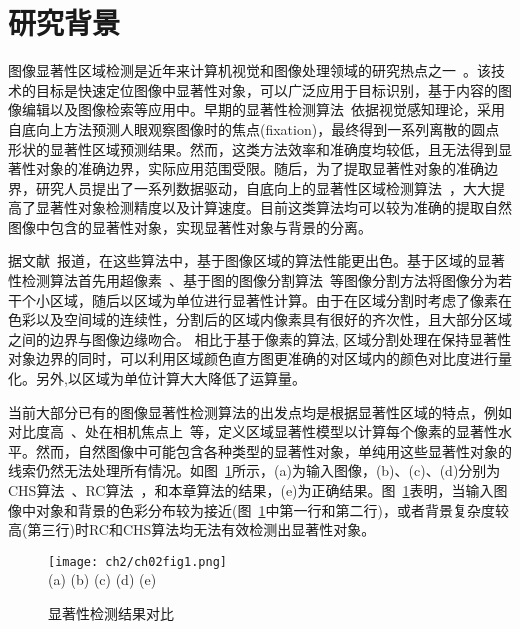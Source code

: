 \section{研究背景}
\label{sec:background}
图像显著性区域检测是近年来计算机视觉和图像处理领域的研究热点之一~\cite{saliencySurvey}。该技术的目标是快速定位图像中显著性对象，可以广泛应用于目标识别，基于内容的图像编辑以及图像检索等应用中。早期的显著性检测算法~\cite{itti}依据视觉感知理论，采用自底向上方法预测人眼观察图像时的焦点(fixation)，最终得到一系列离散的圆点形状的显著性区域预测结果。然而，这类方法效率和准确度均较低，且无法得到显著性对象的准确边界，实际应用范围受限。随后，为了提取显著性对象的准确边界，研究人员提出了一系列数据驱动，自底向上的显著性区域检测算法~\cite{Achanta08,ChengPAMI,ufo,Yan2014Hierarchical}，大大提高了显著性对象检测精度以及计算速度。目前这类算法均可以较为准确的提取自然图像中包含的显著性对象，实现显著性对象与背景的分离。\par
据文献~报道，在这些算法中，基于图像区域的算法性能更出色。基于区域的显著性检测算法首先用超像素~\cite{SLIC}、基于图的图像分割算法~\cite{graphseg}等图像分割方法将图像分为若干个小区域，随后以区域为单位进行显著性计算。由于在区域分割时考虑了像素在色彩以及空间域的连续性，分割后的区域内像素具有很好的齐次性，且大部分区域之间的边界与图像边缘吻合。 相比于基于像素的算法, 区域分割处理在保持显著性对象边界的同时，可以利用区域颜色直方图更准确的对区域内的颜色对比度进行量化。另外,以区域为单位计算大大降低了运算量。\par
当前大部分已有的图像显著性检测算法的出发点均是根据显著性区域的特点，例如对比度高~\cite{ChengPAMI}、处在相机焦点上~\cite{ufo}等，定义区域显著性模型以计算每个像素的显著性水平。然而，自然图像中可能包含各种类型的显著性对象，单纯用这些显著性对象的线索仍然无法处理所有情况。如图~\ref{fig:saliencyCom}所示，(a)为输入图像，(b)、(c)、(d)分别为CHS算法~\cite{Yan2014Hierarchical}、RC算法~\cite{ChengPAMI}，和本章算法的结果，(e)为正确结果。图~\ref{fig:saliencyCom}表明，当输入图像中对象和背景的色彩分布较为接近(图~\ref{fig:saliencyCom}中第一行和第二行)，或者背景复杂度较高(第三行)时RC和CHS算法均无法有效检测出显著性对象。
\begin{figure}[htb]
  \centering%
      {\texttt{[image: ch2/ch02fig1.png]}}\\
(a)\quad\quad\quad\quad\quad
(b)\quad\quad\quad\quad\quad\quad
(c)\quad\quad\quad\quad\quad\quad
(d)\quad\quad\quad\quad\quad
(e)
  \caption{显著性检测结果对比}
  \label{fig:saliencyCom}
\end{figure}

